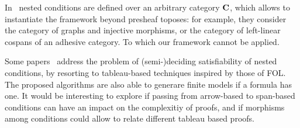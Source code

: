 In~\cite{bchk:conditional-reactive-systems,sksclo:coinductive-techniques-for-satisfiability} nested conditions are defined over an arbitrary category $\mathbf{C}$, which allows to instantiate the framework beyond presheaf toposes: for example, they consider the category of graphs and injective morphisms, or the category of left-linear cospans of an adhesive category.  To which our framework cannot be applied.

Some papers~\cite{lo:tableau-graph-properties,slo:model-generation,sksclo:coinductive-techniques-for-satisfiability} address the problem of (semi-)deciding satisfiability of nested conditions, by resorting to tableau-based techniques inspired by those of FOL. The proposed algorithms are also able to generare finite models if a formula has one.
It would be interesting to explore if passing from arrow-based to span-based conditions can have an impact on  the complexitiy of proofs, and if morphisms among conditions could allow to relate different tableau based proofs.
